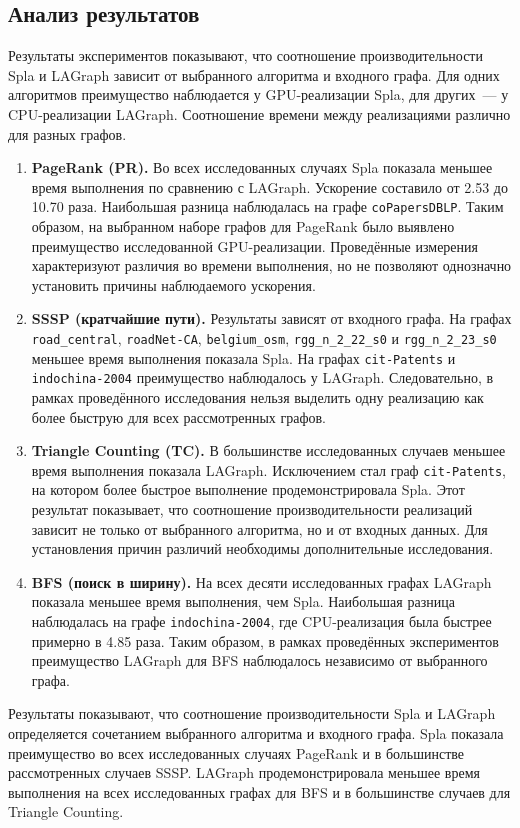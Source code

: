 \documentclass[a4paper]{article}
\begin{document}
\subsection{Анализ результатов}
Результаты экспериментов показывают, что соотношение
производительности Spla и LAGraph зависит от выбранного
алгоритма и входного графа. Для одних алгоритмов преимущество
наблюдается у GPU-реализации Spla, для других~--- у
CPU-реализации LAGraph. Соотношение времени между реализациями различно для разных графов.
\begin{enumerate}
\item \textbf{PageRank (PR).}
Во всех исследованных случаях Spla показала меньшее время
выполнения по сравнению с LAGraph. Ускорение составило
от 2.53 до 10.70 раза. Наибольшая разница наблюдалась
на графе \texttt{coPapersDBLP}. Таким образом, на выбранном
наборе графов для PageRank было выявлено преимущество
исследованной GPU-реализации. Проведённые измерения
характеризуют различия во времени выполнения, но не
позволяют однозначно установить причины наблюдаемого
ускорения.
\item \textbf{SSSP (кратчайшие пути).}
Результаты зависят от входного графа. На графах
\texttt{road\_central}, \texttt{roadNet-CA},
\texttt{belgium\_osm}, \texttt{rgg\_n\_2\_22\_s0}
и \texttt{rgg\_n\_2\_23\_s0} меньшее время выполнения
показала Spla. На графах \texttt{cit-Patents} и
\texttt{indochina-2004} преимущество наблюдалось у
LAGraph. Следовательно, в рамках проведённого исследования
нельзя выделить одну реализацию как более быструю для
всех рассмотренных графов.
\item \textbf{Triangle Counting (TC).}
В большинстве исследованных случаев меньшее время
выполнения показала LAGraph. Исключением стал граф
\texttt{cit-Patents}, на котором более быстрое выполнение
продемонстрировала Spla. Этот результат показывает,
что соотношение производительности реализаций зависит
не только от выбранного алгоритма, но и от входных данных.
Для установления причин различий необходимы
дополнительные исследования.
\item \textbf{BFS (поиск в ширину).}
На всех десяти исследованных графах LAGraph показала
меньшее время выполнения, чем Spla. Наибольшая разница
наблюдалась на графе \texttt{indochina-2004}, где
CPU-реализация была быстрее примерно в 4.85 раза.
Таким образом, в рамках проведённых экспериментов
преимущество LAGraph для BFS наблюдалось независимо
от выбранного графа.
\end{enumerate}

Результаты показывают, что соотношение
производительности Spla и LAGraph определяется сочетанием
выбранного алгоритма и входного графа. Spla показала
преимущество во всех исследованных случаях PageRank и
в большинстве рассмотренных случаев SSSP. LAGraph
продемонстрировала меньшее время выполнения на всех
исследованных графах для BFS и в большинстве случаев
для Triangle Counting.
\end{document}
